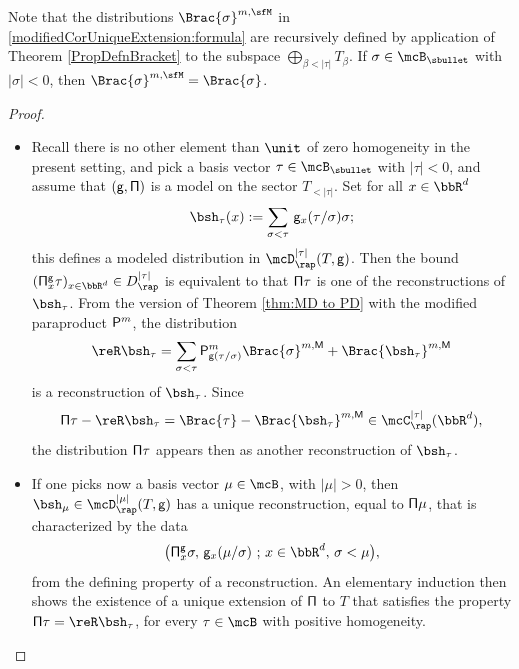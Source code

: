 Note that the distributions $\Brac{\sigma}^{m,\sfM}$ in \eqref{modifiedCorUniqueExtension:formula} are recursively defined by application of Theorem \ref{PropDefnBracket} to the subspace $\bigoplus_{\beta<|\tau|}T_\beta$. If $\sigma\in\mcB_\sbullet$ with $\vert\sigma\vert<0$, then $\Brac{\sigma}^{m,\sfM}=\Brac{\sigma}$.

\skpt
\begin{proof}
\begin{itemize}
\item
Recall there is no other element than $\unit$ of zero homogeneity in the present setting, and pick a basis vector $\tau\in\mcB_\sbullet$ with $|\tau|<0$, and assume that $\sf(g,\Pi)$ is a model on the sector $T_{<|\tau|}$. Set for all $x\in\bbR^d$
\[
\bsh_\tau(x) := \sum_{\sigma<\tau}\, {\sf g}_x(\tau/\sigma)\sigma;
\]
this defines a modeled distribution in $\mcD_\rap^{|\tau|}(T,{\sf g})$. Then the bound $({\sf\Pi}_x^{\sf g}\tau)_{x\in\bbR^d}\in D_{\rap}^{|\tau|}$
is equivalent to that ${\sf \Pi}\tau$ is one of the reconstructions of $\bsh_\tau$. From the version of Theorem \ref{thm:MD to PD} with the modified paraproduct ${\sf P}^m$, the distribution
\[
\reR\bsh_\tau
=\sum_{\sigma<\tau} {\sf P}^m_{{\sf g}(\tau/\sigma)}\Brac{\sigma}^{m,{\sf M}} + \Brac{\bsh_\tau}^{m,{\sf M}}
\]
is a reconstruction of $\bsh_\tau$. Since
\[
{\sf \Pi}\tau - \reR\bsh_\tau = \Brac{\tau} - \Brac{\bsh_\tau}^{m,{\sf M}} \in \mcC_\rap^{|\tau|}(\bbR^d),
\]
the distribution ${\sf \Pi}\tau$ appears then as another reconstruction of $\bsh_\tau$.

\item
If one picks now a basis vector $\mu\in\mcB$, with $|\mu|>0$, then $\bsh_\mu\in\mcD_\rap^{|\mu|}(T,{\sf g})$ has a unique reconstruction, equal to ${\sf \Pi}\mu$, that is characterized by the data
\[
\bigl({\sf\Pi}_x^{\sf g}\sigma,\, {\sf g}_x(\mu/\sigma)\ ;\, x\in\bbR^d,\, \sigma<\mu\bigr),
\]
from the defining property of a reconstruction. An elementary induction then shows the existence of a unique extension of $\sf \Pi$ to $T$ that satisfies the property ${\sf \Pi}\tau = \reR\bsh_\tau$, for every $\tau\in\mcB$ with positive homogeneity.\qedhere
\end{itemize}
\end{proof}

